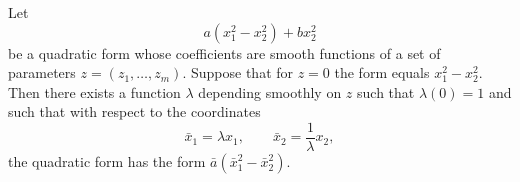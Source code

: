 Let
$$a(x_1^2 - x_2^2) + bx_2^2$$
be a quadratic form whose coefficients are smooth functions of a set of parameters $z = (z_1, \ldots, z_m)$. Suppose that for $z = 0$ the form equals $x_1^2 - x_2^2$. Then there exists a function $\lambda$ depending smoothly on $z$ such that $\lambda(0) = 1$ and such that with respect to the coordinates
$$\bar{x}_1 = \lambda x_1, \qquad \bar{x}_2 = \frac{1}{\lambda} x_2,$$
the quadratic form has the form $\bar{a}(\bar{x}_1^2 - \bar{x}_2^2)$.
